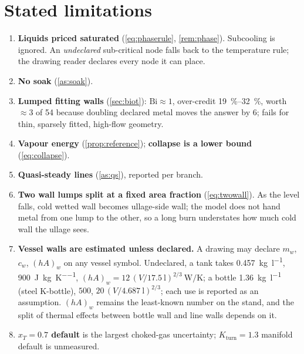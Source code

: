 \documentclass[11pt,a4paper]{article}
\begin{document}
\section{Stated limitations}\label{sec:limits}
\begin{enumerate}[label=(L\arabic*)]
\item \textbf{Liquids priced saturated} (\cref{eq:phaserule}, \cref{rem:phase}).
      Subcooling is ignored. An \emph{undeclared} sub-critical node falls back
      to the temperature rule; the drawing reader declares every node it can
      place.
\item \textbf{No soak} (\cref{as:soak}).
\item \textbf{Lumped fitting walls} (\cref{sec:biot}): $\mathrm{Bi}\approx1$,
      over-credit \SIrange{19}{32}{\percent}, worth $\approx$\SI{3}{\psi} of
      \SI{54}{\psi} because doubling declared metal moves the answer by
      \SI{6}{\psi}; fails for thin, sparsely fitted, high-flow geometry.
\item \textbf{Vapour energy} (\cref{prop:reference}); \textbf{collapse is a lower
      bound} (\cref{eq:collapse}).
\item \textbf{Quasi-steady lines} (\cref{as:qs}), reported per branch.
\item \textbf{Two wall lumps split at a fixed area fraction} (\cref{eq:twowall}).
      As the level falls, cold wetted wall becomes ullage-side wall; the model
      does not hand metal from one lump to the other, so a long burn understates
      how much cold wall the ullage sees.
\item \textbf{Vessel walls are estimated unless declared.} A drawing may
      declare $m_w$, $c_w$, $(hA)_w$ on any vessel symbol. Undeclared, a tank
      takes \SI{0.457}{\kilogram\per\litre}, \SI{900}{\joule\per\kilogram\per\kelvin},
      $(hA)_w = 12\,(V/\SI{17.5}{\litre})^{2/3}\ \si{\watt\per\kelvin}$; a
      bottle \SI{1.36}{\kilogram\per\litre} (steel K-bottle), $500$,
      $20\,(V/\SI{4.687}{\litre})^{2/3}$; each use is reported as an assumption.
      $(hA)_w$ remains the least-known number on the stand, and the split of
      thermal effects between bottle wall and line walls depends on it.
\item \textbf{$x_T=0.7$ default} is the largest choked-gas uncertainty;
      $K_{\mathrm{turn}}=1.3$ manifold default is unmeasured.

\end{enumerate}
\end{document}
